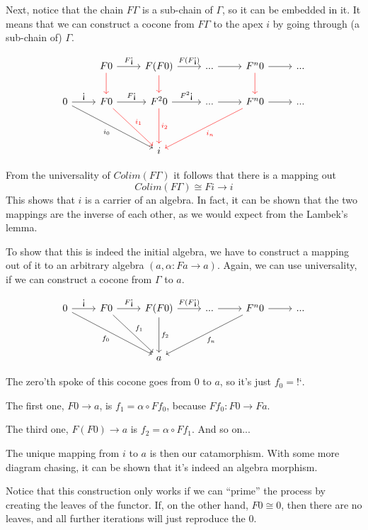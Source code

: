 \documentclass[DaoFP]{subfiles}
\begin{document}
Next, notice that the chain $F \Gamma$ is a sub-chain of $\Gamma$, so it can be embedded in it. It means that we can construct a cocone from $F \Gamma$ to the apex $i$ by going through (a sub-chain of) $\Gamma$. 

\[
 \begin{tikzcd}
 & F 0
  \arrow[r, "F\mbox{!`}"]
  \arrow[d, red]
& F (F 0)
  \arrow[r, "F(F\mbox{!`})"]
  \arrow[d, red]
 & ...
 \arrow[r]
 & F^{n} 0
  \arrow[r]
  \arrow[d, red]
 & ...
 \\
  0
 \arrow[r, "\mbox{!`}"]
 \arrow[ddrr,  "i_0"']
 &  F 0
  \arrow[r, "F  \mbox{!`}"]
 \arrow[ddr, red, "i_1"]
& F^2 0
  \arrow[r, "F^2\mbox{!`}"]
  \arrow[dd, red, "i_2"]
 & ...
 \arrow[r]
 & F^n 0
  \arrow[r]
 \arrow[ddll, red, "i_n"]
 & ...
 \\
 \\
 &&i
  \end{tikzcd}
\]


From the universality of $Colim (F \Gamma)$ it follows that there is a mapping out 
\[Colim (F \Gamma) \cong F i \to i \]
This shows that $i$ is a carrier of an algebra. In fact, it can be shown that the two mappings are the inverse of each other, as we would expect from the Lambek's lemma.

To show that this is indeed the initial algebra, we have to construct a mapping out of it to an arbitrary algebra $(a, \alpha \colon F a \to a)$. Again, we can use universality, if we can construct a cocone from $\Gamma$ to $a$. 

\[
 \begin{tikzcd}
 0
 \arrow[r, "\mbox{!`}"]
 \arrow[ddrr, "f_0"']
 & F 0
  \arrow[r, "F\mbox{!`}"]
 \arrow[ddr, "f_1"]
& F (F 0)
  \arrow[r, "F(F\mbox{!`})"]
  \arrow[dd, "f_2"]
 & ...
 \arrow[r]
 & F^n 0
  \arrow[r]
 \arrow[ddll, "f_n"]
 & ...
 \\
 \\
 &&a
  \end{tikzcd}
\]


The zero'th spoke of this cocone goes from $0$ to $a$, so it's just $f_0 = \mbox{!`}$.

The first one, $F 0 \to a$, is $f_1 = \alpha \circ F f_0$, because $F f_0 \colon F 0 \to F a$.

The third one, $F (F 0) \to a$ is  $f_2 = \alpha \circ F f_1$.  And so on...

The unique mapping from $i$ to $a$ is then our catamorphism. With some more diagram chasing, it can be shown that it's indeed an algebra morphism. 

Notice that this construction only works if we can ``prime'' the process by creating the leaves of the functor. If, on the other hand, $F 0 \cong 0$, then there are no leaves, and all further iterations will just reproduce the $0$. 
\end{document}
